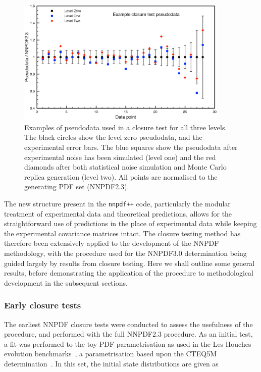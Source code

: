 \begin{figure}[ht]
\centering
\includegraphics[width=0.9\textwidth]{7-PostLHC/figs/Closuretest_levels/closuretest_levels.eps}
\caption[Closure test pseudodata example]{Examples of pseudodata used in a closure test for all three levels. The black circles show the level zero pseudodata, and the experimental error bars. The blue squares show the pseudodata after experimental noise has been simulated (level one) and the red diamonds after both statistical noise simulation and Monte Carlo replica generation (level two). All points are normalised to the generating PDF set (NNPDF2.3).}
\label{fig:closurepseudodata}
\end{figure}

The new structure present in the {\tt nnpdf++} code, particularly the modular treatment of experimental data and theoretical predictions, allows for the straightforward use of predictions in the place of experimental data while keeping the experimental covariance matrices intact. The closure testing method has therefore been extensively applied to the development of the NNPDF methodology, with the procedure used for the NNPDF3.0 determination being guided largely by results from closure testing. Here we shall outline some general results, before demonstrating the application of the procedure to methodological development in the subsequent sections.

\subsubsection{Early closure tests}
The earliest NNPDF closure tests were conducted to assess the usefulness of the procedure, and performed with the full NNPDF2.3 procedure. As an initial test, a fit was performed to the toy PDF parametrisation as used in the Les Houches evolution benchmarks~\cite{Giele:2002hx}, a parametrisation based upon the CTEQ5M determination~\cite{Lai:1999wy}. In this set, the initial state distributions are given as

